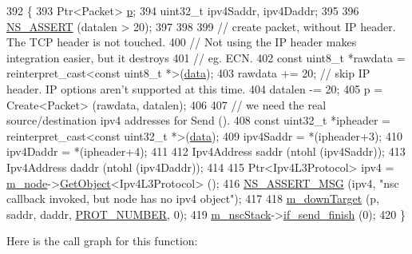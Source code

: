 \begin{DoxyCode}
392 \{
393   Ptr<Packet> \hyperlink{lte__link__budget_8m_ac9de518908a968428863f829398a4e62}{p};
394   uint32\_t ipv4Saddr, ipv4Daddr;
395 
396   \hyperlink{assert_8h_a6dccdb0de9b252f60088ce281c49d052}{NS\_ASSERT} (datalen > 20);
397 
398 
399   \textcolor{comment}{// create packet, without IP header. The TCP header is not touched.}
400   \textcolor{comment}{// Not using the IP header makes integration easier, but it destroys}
401   \textcolor{comment}{// eg. ECN.}
402   \textcolor{keyword}{const} uint8\_t *rawdata = \textcolor{keyword}{reinterpret\_cast<}\textcolor{keyword}{const }uint8\_t *\textcolor{keyword}{>}(\hyperlink{topology-example-sim_8cc_a26c65296e316af77b787dc77469bb2a4}{data});
403   rawdata += 20; \textcolor{comment}{// skip IP header. IP options aren't supported at this time.}
404   datalen -= 20;
405   p = Create<Packet> (rawdata, datalen);
406 
407   \textcolor{comment}{// we need the real source/destination ipv4 addresses for Send ().}
408   \textcolor{keyword}{const} uint32\_t *ipheader = \textcolor{keyword}{reinterpret\_cast<}\textcolor{keyword}{const }uint32\_t *\textcolor{keyword}{>}(\hyperlink{topology-example-sim_8cc_a26c65296e316af77b787dc77469bb2a4}{data});
409   ipv4Saddr = *(ipheader+3);
410   ipv4Daddr = *(ipheader+4);
411 
412   Ipv4Address saddr (ntohl (ipv4Saddr));
413   Ipv4Address daddr (ntohl (ipv4Daddr));
414 
415   Ptr<Ipv4L3Protocol> ipv4 = \hyperlink{classns3_1_1NscTcpL4Protocol_a1a7121d0e0f775582e6b01a3e7bc1a6c}{m\_node}->\hyperlink{classns3_1_1Object_a13e18c00017096c8381eb651d5bd0783}{GetObject}<Ipv4L3Protocol> ();
416   \hyperlink{assert_8h_aff5ece9066c74e681e74999856f08539}{NS\_ASSERT\_MSG} (ipv4, \textcolor{stringliteral}{"nsc callback invoked, but node has no ipv4 object"});
417 
418   \hyperlink{classns3_1_1NscTcpL4Protocol_a83227e4d5dbb352bb29edf0ee48a026e}{m\_downTarget} (p, saddr, daddr, \hyperlink{classns3_1_1NscTcpL4Protocol_afad61be589382ee316540dfa856d6f5b}{PROT\_NUMBER}, 0);
419   \hyperlink{classns3_1_1NscTcpL4Protocol_abf40617904f5f2e4424ab79545efb04f}{m\_nscStack}->\hyperlink{structINetStack_afffc356feed7f466f83c20804192df28}{if\_send\_finish} (0);
420 \}
\end{DoxyCode}


Here is the call graph for this function\+:


